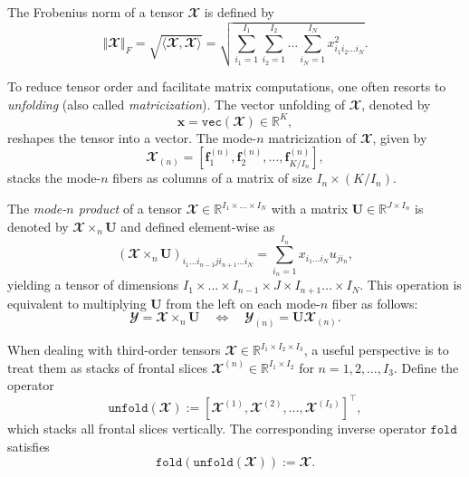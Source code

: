 \documentclass[pdflatex,sn-mathphys-num]{sn-jnl}%
\theoremstyle{thmstyleone}%
\theoremstyle{thmstyletwo}%
\theoremstyle{thmstylethree}%
\begin{document}
The Frobenius norm of a tensor $\mathbfcal{X}$ is defined by
\begin{equation}
	\left\Vert \mathbfcal{X} \right\Vert_F = \sqrt{\langle \mathbfcal{X},\mathbfcal{X} \rangle} = \sqrt{ \sum_{i_1=1}^{I_1} \sum_{i_2=1}^{I_2} \dots \sum_{i_N=1}^{I_N} x_{i_1 i_2 \dots i_N}^2 }.
\end{equation}

To reduce tensor order and facilitate matrix computations, one often resorts to \textit{unfolding} (also called \textit{matricization}). The vector unfolding of $\mathbfcal{X}$, denoted by
\begin{equation}
	\mathbf{x} = \mathtt{vec}(\mathbfcal{X}) \in \mathbb{R}^K,
\end{equation}
reshapes the tensor into a vector. The mode-$n$ matricization of $\mathbfcal{X}$, given by
\begin{equation}
	\mathbfcal{X}_{(n)} = [\mathbf{f}_1^{(n)}, \mathbf{f}_2^{(n)}, \dots, \mathbf{f}_{K/I_n}^{(n)}],
\end{equation}
stacks the mode-$n$ fibers as columns of a matrix of size $I_n \times (K/I_n)$.

The \textit{mode-$n$ product} of a tensor $\mathbfcal{X} \in \mathbb{R}^{I_1 \times \dots \times I_N}$ with a matrix $\mathbf{U} \in \mathbb{R}^{J \times I_n}$ is denoted by $\mathbfcal{X} \times_n \mathbf{U}$ and defined element-wise as
\begin{equation}
	(\mathbfcal{X} \times_n \mathbf{U})_{i_1 \dots i_{n-1} j i_{n+1} \dots i_N} = \sum_{i_n=1}^{I_n} x_{i_1 \dots i_N} u_{j i_n},
\end{equation}
yielding a tensor of dimensions $I_1 \times \dots \times I_{n-1} \times J \times I_{n+1} \dots \times I_N$. This operation is equivalent to multiplying $\mathbf{U}$ from the left on each mode-$n$ fiber as follows:
\begin{equation}
	\mathbfcal{Y} = \mathbfcal{X} \times_n \mathbf{U} \quad \Longleftrightarrow \quad \mathbfcal{Y}_{(n)} = \mathbf{U} \mathbfcal{X}_{(n)}.
\end{equation}

When dealing with third-order tensors $\mathbfcal{X} \in \mathbb{R}^{I_1 \times I_2 \times I_3}$, a useful perspective is to treat them as stacks of frontal slices $\mathbfcal{X}^{(n)} \in \mathbb{R}^{I_1 \times I_2}$ for $n=1,2, \dots, I_3$. Define the operator
\begin{equation}
	\mathtt{unfold}(\mathbfcal{X}) := [\mathbfcal{X}^{(1)}, \mathbfcal{X}^{(2)}, \dots, \mathbfcal{X}^{(I_3)}]^\top,
\end{equation}
which stacks all frontal slices vertically. The corresponding inverse operator $\mathtt{fold}$ satisfies
\begin{equation}
	\mathtt{fold}(\mathtt{unfold}(\mathbfcal{X})) := \mathbfcal{X}.
\end{equation}
\end{document}
